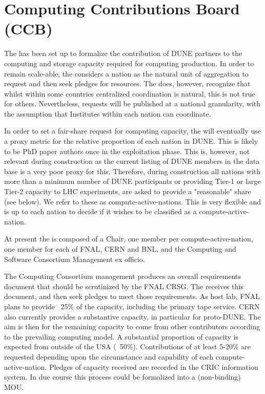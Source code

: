 \documentclass[../main-v1.tex]{subfiles}
\begin{document}
\chapter{Computing Contributions Board (CCB) }
\label{ch:ccb}


The  has been set up to formalize the contribution of DUNE partners to the computing and storage capacity required for computing production. In order to remain scale-able, the  considers a nation as the natural unit of aggregation to request and then seek pledges for resources. The  does, however, recognize that whilst within some countries centralized coordination is natural, this is not true for others. Nevertheless, requests will be published at a national granularity, with the assumption that Institutes within each nation can coordinate.

In order to set a fair-share request for computing capacity, the  will eventually use a proxy metric for the relative proportion of each nation in DUNE. This is likely to be PhD paper authors once in the exploitation phase. This is, however, not relevant during construction as the current listing of DUNE members in the data base is a very poor proxy for this. Therefore, during construction all nations with more than a minimum number of DUNE participants or providing Tier-1 or large Tier-2 capacity to LHC experiments, are asked to provide a "reasonable" share (see below). We refer to these as compute-active-nations.
This is very flexible and is up to each nation to decide if it wishes to be classified as a compute-active-nation.

At present the  is composed of a Chair, one member per compute-active-nation, one member for each of FNAL, CERN and BNL, and the Computing and Software Consortium  Management ex officio.

The Computing Consortium management produces an overall requirements document that should be scrutinized by the FNAL CRSG. The  receives this document, and then seek pledges to meet those requirements. As host lab, FNAL plans to provide ~25\% of the capacity, including the primary tape service.
CERN also currently provides a substantive capacity, in particular for proto-DUNE.
The aim is then for the remaining capacity to come from other contributors according to the prevailing computing model. A substantial proportion of capacity is expected from outside of the USA  (~50\%). Contributions of at least 5-20\% are requested depending upon the circumstance and capability of each compute-active-nation.
Pledges of capacity received are recorded in the CRIC information system. In due course this process could be formalized into a (non-binding) MOU.
\end{document}
